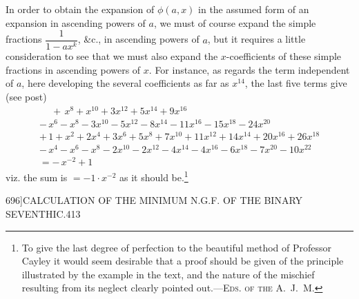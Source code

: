 \documentclass[11pt]{article}
\begin{document}
In order to obtain the expansion of $\phi(a, x)$ in the assumed form of an expansion in ascending powers of $a$, we must of course expand the simple fractions $\dfrac{1}{1 - ax^{k}}$, \&c., in ascending powers of $a$, but it requires a little consideration to see that we must also expand the $x$-coefficients of these simple fractions in ascending powers of $x$. For instance, as regards the term independent of $a$, here developing the several coefficients as far as $x^{14}$, the last five terms give (see post)
\[ \begin{array}{l}
\phantom{-}+\, x^{8} + x^{10} + 3x^{12} + 5x^{14} + 9x^{16}\\
-\,x^{6} - x^{8} - 3x^{10} - 5x^{12} - 8x^{14} - 11x^{16} - 15x^{18} - 24x^{20}\\
+\,1 + x^{2} + 2x^{4} + 3x^{6} + 5x^{8} + 7x^{10} + 11x^{12} + 14x^{14} + 20x^{16} + 26x^{18}\\
-\,x^{4} - x^{6} - x^{8} - 2x^{10} - 2x^{12} - 4x^{14} - 4x^{16} - 6x^{18} - 7x^{20} - 10x^{22}\\
= -\,x^{-2} + 1
\end{array} \]
viz. the sum is $= -1 \cdot x^{-2}$ as it should be.\footnote{To give the last degree of perfection to the beautiful method of Professor Cayley it would seem desirable that a proof should be given of the principle illustrated by the example in the text, and the nature of the mischief resulting from its neglect clearly pointed out.---\textsc{Eds. of the A.~J.~M.}}

\clearpage
\begin{center}\small 696]\hfill CALCULATION OF THE MINIMUM N.G.F. OF THE BINARY SEVENTHIC.\hfill 413\end{center}
\end{document}
